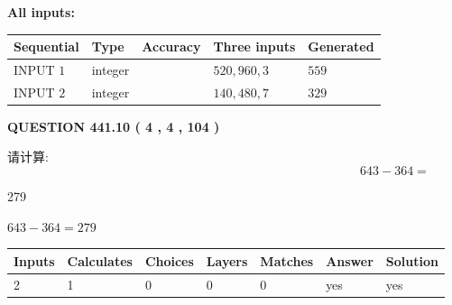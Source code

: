 \documentclass{ctexart}
\begin{document}
   
   
   
\noindent\vspace{0.1in}\hspace{-0.08in} {\textbf{\Large{All inputs: }}}
   
   
  
  
\noindent\begin{tabular}{|l|l|l|l|l|}
\hline
 Sequential & Type & Accuracy & Three inputs & Generated \\ 
\hline
 
 
  INPUT $  1 $ & integer &  & $
 520
 , 
 960
 , 
 3
 $ & $ 559 $ 
 \\  \hline  
 
 
  INPUT $  2 $ & integer &  & $
 140
 , 
 480
 , 
 7
 $ & $ 329 $ 
 \\  \hline  
 \end{tabular}
   
   
  
\vspace{0.2in}
  
{\textbf{\Large{QUESTION
441.10 
 ( 4 , 4 , 104 )
}}}
  
  
 
请计算:
\begin{equation}
643 -   %
364 = \nonumber
\end{equation}
 
 
 
\noindent{}
 
 

279
 
 
\noindent{}
 
 

 
 
 
\noindent{}
 
 

$ %
643 -  %
364=   %
279$
 
 
\noindent{}
 
 

 
   
   
   
   
\noindent\begin{tabular}{|l|l|l|l|l|l|l|}
 \hline
Inputs & Calculates & Choices & Layers & Matches & Answer & Solution \\ \hline
 2  & 
 1  & 
 0
  & 
 0  & 
 0  & 
  yes & 
  yes 
  \\ \hline
 \end{tabular}
   
\end{document}
